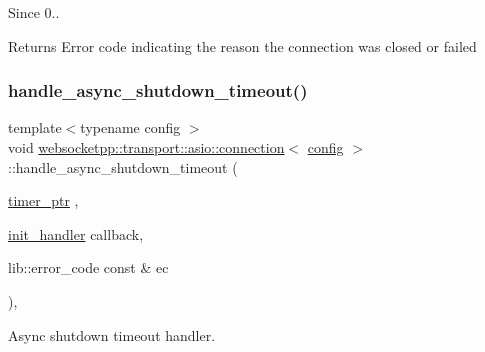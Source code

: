 \begin{DoxySince}{Since}
0..
\end{DoxySince}
\begin{DoxyReturn}{Returns}
Error code indicating the reason the connection was closed or failed 
\end{DoxyReturn}
\mbox{\label{classwebsocketpp_1_1transport_1_1asio_1_1connection_a9386ad48e8b2137987205bc4e831edfb}} 
\subsubsection{\texorpdfstring{handle\+\_\+async\+\_\+shutdown\+\_\+timeout()}{handle\_async\_shutdown\_timeout()}}
{\footnotesize\ttfamily template$<$typename config $>$ \\
void \mbox{\hyperlink{classwebsocketpp_1_1transport_1_1asio_1_1connection}{websocketpp\+::transport\+::asio\+::connection}}$<$ \mbox{\hyperlink{classconfig}{config}} $>$\+::handle\+\_\+async\+\_\+shutdown\+\_\+timeout (\begin{DoxyParamCaption}\item[{\mbox{\hyperlink{classwebsocketpp_1_1transport_1_1asio_1_1connection_a96d8a6cd5cf1120208b206da109a194e}{timer\+\_\+ptr}}}]{,  }\item[{\mbox{\hyperlink{namespacewebsocketpp_1_1transport_aeae75e675c1a334b3b33ab7120b480a5}{init\+\_\+handler}}}]{callback,  }\item[{lib\+::error\+\_\+code const \&}]{ec }\end{DoxyParamCaption})\hspace{0.3cm}{\ttfamily [inline]}, {\ttfamily [protected]}}



Async shutdown timeout handler. 


